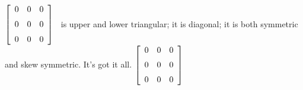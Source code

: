 {$\left[ \begin {array}{ccc} 0&0&0\\\noalign{\medskip}0&0&0
\\\noalign{\medskip}0&0&0\end {array} \right]$} 
{\tta\ is upper and lower triangular; it is diagonal; it is both symmetric and skew symmetric. It's got it all. $\left[ \begin {array}{ccc} 0&0&0\\\noalign{\medskip}0&0&0\\\noalign{\medskip}0&0&0\end {array} \right]
$}



  

